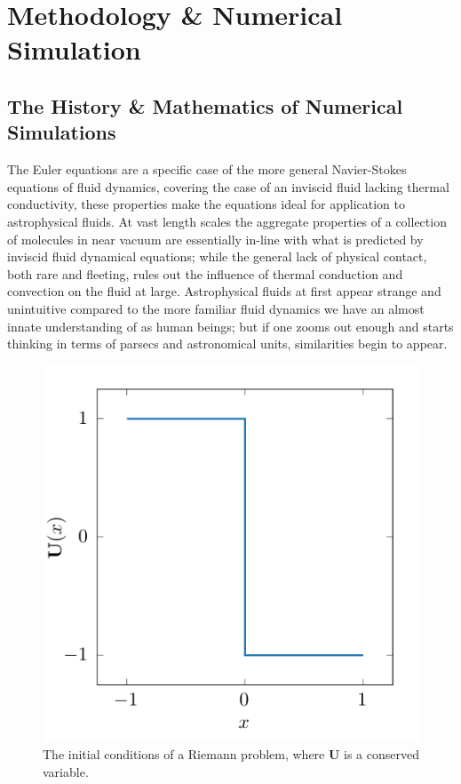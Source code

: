 \chapter{Methodology \& Numerical Simulation}
\label{ch:numsim}




\section{The History \& Mathematics of Numerical Simulations}
\label{sec:numerical-math}
\label{sec:numsim}


The Euler equations are a specific case of the more general Navier-Stokes equations of fluid dynamics, covering the case of an inviscid fluid lacking thermal conductivity, these properties make the equations ideal for application to astrophysical fluids.
At vast length scales the aggregate properties of a collection of molecules in near vacuum are essentially in-line with what is predicted by inviscid fluid dynamical equations; while the general lack of physical contact, both rare and fleeting, rules out the influence of thermal conduction and convection on the fluid at large.
Astrophysical fluids at first appear strange and unintuitive compared to the more familiar fluid dynamics we have an almost innate understanding of as human beings; but if one zooms out enough and starts thinking in terms of parsecs and astronomical units, similarities begin to appear. 

\begin{figure}[h]
  \centering
  \includegraphics[]{assets/riemann-interface/riemann.pdf}
  \caption[Initial conditions of a Riemann problem]{The initial conditions of a Riemann problem, where $\mathbf{U}$ is a conserved variable.}
  \label{fig:riemann}
\end{figure}


